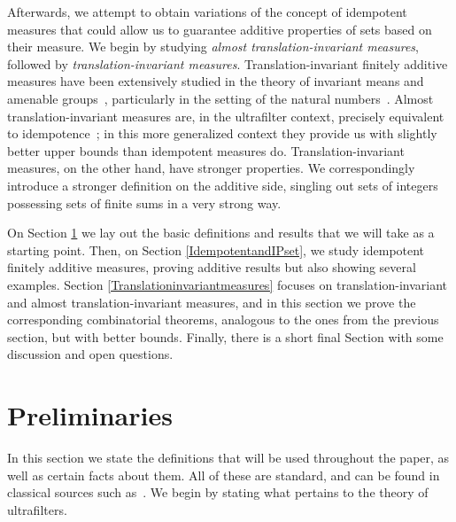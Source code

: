 \documentclass{jloganal}
\theoremstyle{definition}
\begin{document}
Afterwards, we attempt to obtain variations of the concept of idempotent measures that could allow us to guarantee additive properties of sets based on their measure. We begin by studying {\it almost translation-invariant measures}, followed by {\it translation-invariant measures}. 
Translation-invariant finitely additive measures have been extensively studied in the theory of invariant means and amenable groups~\cite{F.Greenleaf}, particularly in the setting of the natural numbers~\cite{Gardner}.  Almost translation-invariant measures are, in the ultrafilter context, precisely equivalent to idempotence~\cite{Hindman-Strauss}; in this more generalized context they provide us with slightly better upper bounds than idempotent measures do. Translation-invariant measures, on the other hand, have stronger properties. We correspondingly introduce a stronger definition on the additive side, singling out sets of integers possessing sets of finite sums in a very strong way.

On Section \ref{Preliminaries} we lay out the basic definitions and results that we will take as a starting point. Then, on Section \ref{IdempotentandIPset}, we study idempotent finitely additive measures, proving additive results but also showing several examples. Section \ref{Translationinvariantmeasures} focuses on translation-invariant and almost translation-invariant measures, and in this section we prove the corresponding combinatorial theorems, analogous to the ones from the previous section, but with better bounds. Finally, there is a short final Section with some discussion and open questions.

\section{Preliminaries}
\label{Preliminaries}

In this section we state the definitions that will be used throughout the paper, as well as certain facts about them. All of these are standard, and can be found in classical sources such as~\cite{comfort-negrepontis,Hindman-Strauss,dales-automatic,Dunford-Schwartz}. We begin by stating what pertains to the theory of ultrafilters.
\end{document}
